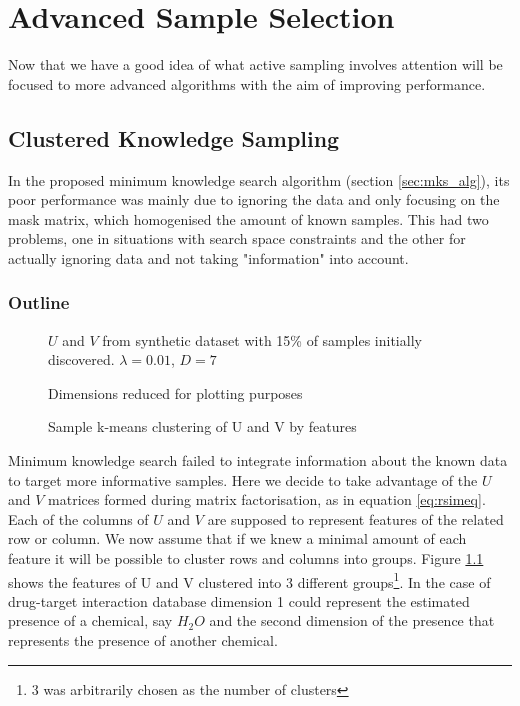 \chapter{Advanced Sample Selection}
\ifpdf
    \graphicspath{{Chapter3/Chapter3Figs/PNG/}{Chapter3/Chapter3Figs/PDF/}{Chapter3/Chapter3Figs/}}
\else
    \graphicspath{{Chapter3/Chapter3Figs/EPS/}{Chapter3/Chapter3Figs/}}
\fi


Now that we have a good idea of what active sampling involves attention will be focused to more advanced algorithms with the aim of improving performance.
\section{Clustered Knowledge Sampling}
\label{sec:cks}
In the proposed minimum knowledge search algorithm (section \ref{sec:mks_alg}), its poor performance was mainly due to ignoring the data and only focusing on the mask matrix, which homogenised the amount of known samples. This had two problems, one in situations with search space constraints and the other for actually ignoring data and not taking "information" into account.


\subsection{Outline}

\begin{figure}[!htbp]
  \begin{center}
    \resizebox{\textwidth}{!}{}
  \end{center}
    
$U$ and $V$ from synthetic dataset with 15\% of samples initially discovered.  $\lambda = 0.01$, $D=7$

Dimensions reduced for plotting purposes
    \caption{Sample k-means clustering of U and V by features}
    \label{fig:u_v_cluster}
\end{figure}

Minimum knowledge search failed to integrate information about the known data to target more informative samples. Here we decide to take advantage of the $U$ and $V$ matrices formed during matrix factorisation, as in equation \ref{eq:rsimeq}. Each of the columns of $U$ and $V$ are supposed to represent features of the related row or column. We now assume that if we knew a minimal amount of each feature it will be possible to cluster rows and columns into groups. Figure \ref{fig:u_v_cluster} shows the features of U and V clustered into 3 different groups\footnote{3 was arbitrarily chosen as the number of clusters}. In the case of drug-target interaction database dimension 1 could represent the estimated presence of a chemical, say $H_2O$ and the second dimension of the presence that represents the presence of another chemical.

